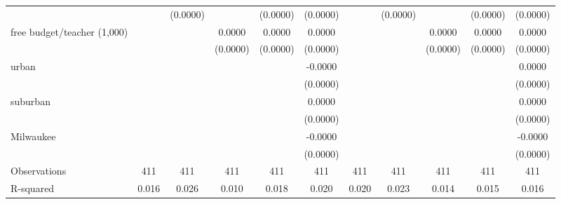 {\begin{tabular}{l*{10}{c}}
                    &                     &    (0.0000)         &                     &    (0.0000)         &    (0.0000)         &                     &    (0.0000)         &                     &    (0.0000)         &    (0.0000)         \\
[1em]
free budget/teacher (1,000)&                     &                     &      0.0000         &      0.0000\sym{*}  &      0.0000\sym{*}  &                     &                     &      0.0000\sym{*}  &      0.0000         &      0.0000         \\
                    &                     &                     &    (0.0000)         &    (0.0000)         &    (0.0000)         &                     &                     &    (0.0000)         &    (0.0000)         &    (0.0000)         \\
[1em]
urban               &                     &                     &                     &                     &     -0.0000         &                     &                     &                     &                     &      0.0000         \\
                    &                     &                     &                     &                     &    (0.0000)         &                     &                     &                     &                     &    (0.0000)         \\
[1em]
suburban            &                     &                     &                     &                     &      0.0000         &                     &                     &                     &                     &      0.0000         \\
                    &                     &                     &                     &                     &    (0.0000)         &                     &                     &                     &                     &    (0.0000)         \\
[1em]
Milwaukee           &                     &                     &                     &                     &     -0.0000         &                     &                     &                     &                     &     -0.0000         \\
                    &                     &                     &                     &                     &    (0.0000)         &                     &                     &                     &                     &    (0.0000)         \\
\hline
Observations        &         411         &         411         &         411         &         411         &         411         &         411         &         411         &         411         &         411         &         411         \\
R-squared           &       0.016         &       0.026         &       0.010         &       0.018         &       0.020         &       0.020         &       0.023         &       0.014         &       0.015         &       0.016         \\
\hline\hline
\end{tabular}
}
